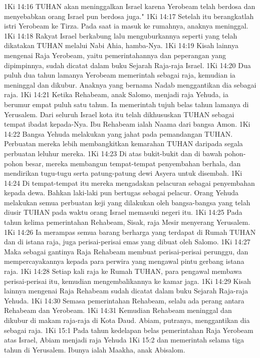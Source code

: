 1Ki 14:16  TUHAN akan meninggalkan Israel karena Yerobeam telah berdosa dan menyebabkan orang Israel pun berdosa juga."
1Ki 14:17  Setelah itu berangkatlah istri Yerobeam ke Tirza. Pada saat ia masuk ke rumahnya, anaknya meninggal.
1Ki 14:18  Rakyat Israel berkabung lalu menguburkannya seperti yang telah dikatakan TUHAN melalui Nabi Ahia, hamba-Nya.
1Ki 14:19  Kisah lainnya mengenai Raja Yerobeam, yaitu pemerintahannya dan peperangan yang dipimpinnya, sudah dicatat dalam buku Sejarah Raja-raja Israel.
1Ki 14:20  Dua puluh dua tahun lamanya Yerobeam memerintah sebagai raja, kemudian ia meninggal dan dikubur. Anaknya yang bernama Nadab menggantikan dia sebagai raja.
1Ki 14:21  Ketika Rehabeam, anak Salomo, menjadi raja Yehuda, ia berumur empat puluh satu tahun. Ia memerintah tujuh belas tahun lamanya di Yerusalem. Dari seluruh Israel kota itu telah dikhususkan TUHAN sebagai tempat ibadat kepada-Nya. Ibu Rehabeam ialah Naama dari bangsa Amon.
1Ki 14:22  Bangsa Yehuda melakukan yang jahat pada pemandangan TUHAN. Perbuatan mereka lebih membangkitkan kemarahan TUHAN daripada segala perbuatan leluhur mereka.
1Ki 14:23  Di atas bukit-bukit dan di bawah pohon-pohon besar, mereka membangun tempat-tempat penyembahan berhala, dan mendirikan tugu-tugu serta patung-patung dewi Asyera untuk disembah.
1Ki 14:24  Di tempat-tempat itu mereka mengadakan pelacuran sebagai penyembahan kepada dewa. Bahkan laki-laki pun bertugas sebagai pelacur. Orang Yehuda melakukan semua perbuatan keji yang dilakukan oleh bangsa-bangsa yang telah diusir TUHAN pada waktu orang Israel memasuki negeri itu.
1Ki 14:25  Pada tahun kelima pemerintahan Rehabeam, Sisak, raja Mesir menyerang Yerusalem.
1Ki 14:26  Ia merampas semua barang berharga yang terdapat di Rumah TUHAN dan di istana raja, juga perisai-perisai emas yang dibuat oleh Salomo.
1Ki 14:27  Maka sebagai gantinya Raja Rehabeam membuat perisai-perisai perunggu, dan mempercayakannya kepada para perwira yang mengawal pintu gerbang istana raja.
1Ki 14:28  Setiap kali raja ke Rumah TUHAN, para pengawal membawa perisai-perisai itu, kemudian mengembalikannya ke kamar jaga.
1Ki 14:29  Kisah lainnya mengenai Raja Rehabeam sudah dicatat dalam buku Sejarah Raja-raja Yehuda.
1Ki 14:30  Semasa pemerintahan Rehabeam, selalu ada perang antara Rehabeam dan Yerobeam.
1Ki 14:31  Kemudian Rehabeam meninggal dan dikubur di makam raja-raja di Kota Daud. Abiam, putranya, menggantikan dia sebagai raja.
1Ki 15:1  Pada tahun kedelapan belas pemerintahan Raja Yerobeam atas Israel, Abiam menjadi raja Yehuda
1Ki 15:2  dan memerintah selama tiga tahun di Yerusalem. Ibunya ialah Maakha, anak Abisalom.
